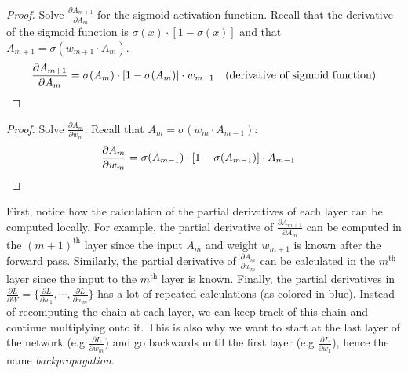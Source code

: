 \documentclass[11pt]{article}
\numberwithin{equation}{section}
\theoremstyle{definition}%
\begin{document}
\begin{proof}
    Solve $\frac{\partial A_{m+1}}{\partial A_{m}}$ for the sigmoid activation function. Recall that the derivative of the sigmoid function is $\sigma(x) \cdot [1-\sigma(x)]$ and that $A_{m+1} = \sigma (w_{m+1} \cdot A_{m})$.
    \begin{align*}
        \frac{\partial A_{m+1}}{\partial A_{m}} &= \sigma(A_{m}) \cdot [1 - \sigma(A_{m})] \cdot w_{m+1} &&\text{(derivative of sigmoid function)} \qedhere\\
    \end{align*}
\end{proof}

\begin{proof}
    Solve $\frac{\partial A_m}{\partial w_m}$. Recall that $A_m = \sigma (w_m \cdot A_{m-1})$:
    \begin{align*}
        \frac{\partial A_m}{\partial w_m} &= \sigma(A_{m-1}) \cdot [1 - \sigma(A_{m-1})] \cdot A_{m-1} \qedhere
    \end{align*}
\end{proof}

First, notice how the calculation of the partial derivatives of each layer can be computed locally. For example, the partial derivative of $\frac{\partial A_{m+1}}{\partial A_{m}}$ can be computed in the $(m+1)^{\text{th}}$ layer since the input $A_{m}$ and weight $w_{m+1}$ is known after the forward pass. Similarly, the partial derivative of $\frac{\partial A_m}{\partial w_m}$ can be calculated in the $m^{\text{th}}$ layer since the input to the $m^{\text{th}}$ layer is known. Finally, the partial derivatives in $\frac{\partial L}{\partial W} = \{ \frac{\partial L}{\partial w_1}, \cdots , \frac{\partial L}{\partial w_m}\}$ has a lot of repeated calculations (as colored in blue). Instead of recomputing the chain at each layer, we can keep track of this chain and continue multiplying onto it. This is also why we want to start at the last layer of the network (e.g $\frac{\partial L}{\partial w_m}$) and go backwards until the first layer (e.g $\frac{\partial L}{\partial w_1}$), hence the name \emph{backpropagation}.


\end{document}
